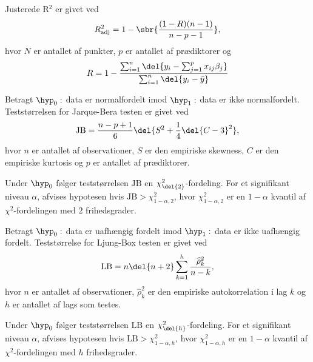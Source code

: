 \begin{defn}[justerede R$^2$] \label{def:adjr2}
Justerede R$^2$ er givet ved
\begin{align*}
R^2_{\text{adj}} = 1 - \sbr{\frac{(1 - R)(n-1)}{n - p -1}},
\end{align*}
hvor $N$ er antallet af punkter, $p$ er antallet af prædiktorer og 
\begin{align*}
R = 1 - \frac{\sum_{i = 1}^n \del{y_i - \sum_{j=1}^px_{ij} \beta_j}}{\sum_{i = 1}^n \del{y_i - \bar{y}}}
\end{align*}
\end{defn}
 

\begin{defn} \label{def:jbtest}
Betragt \(\hyp_0: \) data er normalfordelt imod \(\hyp_1:\) data er ikke normalfordelt.
Teststørrelsen for Jarque-Bera testen er givet ved
\begin{align*}
\text{JB} = \frac{n-p+1}{6} \del{S^2 + \frac{1}{4} \del{C-3}^2},
\end{align*}
hvor \(n\) er antallet af observationer, \(S\) er den empiriske skewness, \(C\) er den empiriske kurtosis og \(p\) er antallet af prædiktorer.
\end{defn}
Under \(\hyp_0\) følger teststørrelsen \(\text{JB}\) en \(\chi_{\del{2}}^2\)-fordeling.
For et signifikant niveau \(\alpha\), afvises hypotesen hvis \(\text{JB} > \chi_{1-\alpha,2}^2\), hvor \(\chi_{1-\alpha,2}^2\) er en \(1 - \alpha\) kvantil af \(\chi^2\)-fordelingen med \(2\) frihedsgrader.

\begin{defn} \label{def:lbtest}
Betragt \(\hyp_0 :\) data er uafhængig fordelt imod \(\hyp_1 :\) data er ikke uafhængig fordelt.
Teststørrelse for Ljung-Box testen er givet ved
\begin{align*}
\text{LB} = n \del{n +2} \sum_{k=1}^h \frac{\widehat{\rho}_k^2}{n-k},
\end{align*}
hvor \(n\) er antallet af observationer, \(\widehat{\rho}_k^2\) er den empiriske autokorrelation i lag \(k\) og \(h\) er antallet af lags som testes.
\end{defn}
Under \(\hyp_0\) følger teststørrelsen \(\text{LB}\) en \(\chi_{\del{h}}^2\)-fordeling.
For et signifikant niveau \(\alpha\), afvises hypotesen hvis \(\text{LB} > \chi_{1-\alpha,h}^2\), hvor \(\chi_{1-\alpha,h}^2\) er en \(1 - \alpha\) kvantil af \(\chi^2\)-fordelingen med \(h\) frihedsgrader.


